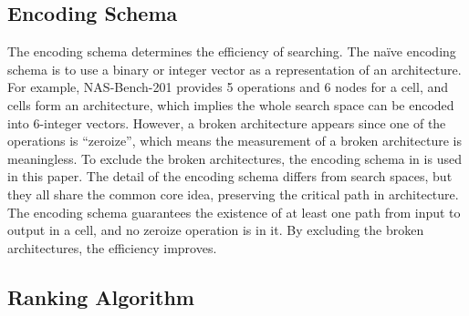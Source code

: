 \documentclass[sigconf]{acmart}
\begin{document}
    \subsection{Encoding Schema}

    The encoding schema determines the efficiency of searching. The naïve encoding 
    schema is to use a binary or integer vector as a representation of an architecture. 
    For example, NAS-Bench-201 provides 5 operations and 6 nodes for a cell, 
    and cells form an architecture, which implies the whole search space can be 
    encoded into 6-integer vectors. However, a broken architecture appears since 
    one of the operations is ``zeroize'', which means the measurement of a broken 
    architecture is meaningless. To exclude the broken architectures, the encoding 
    schema in \cite{10092788} is used in this paper. The detail of the encoding 
    schema differs from search spaces, but they all share the common core idea, 
    preserving the critical path in architecture. The encoding schema guarantees 
    the existence of at least one path from input to output in a cell, and no 
    zeroize operation is in it. By excluding the broken architectures, the efficiency 
    improves. 

    \subsection{Ranking Algorithm}
\end{document}
